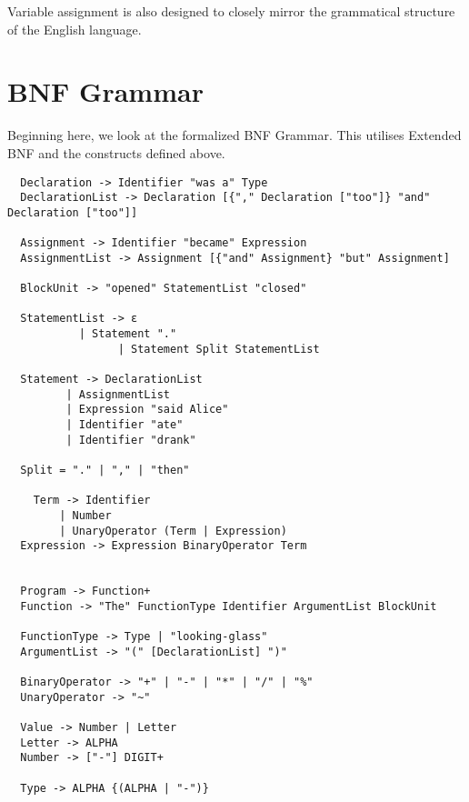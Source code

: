 \documentclass[a4wide, 11pt]{article}
\begin{document}
Variable assignment is also designed to closely mirror the grammatical structure of the English language.

\section{BNF Grammar} 

Beginning here, we look at the formalized BNF Grammar. This utilises Extended BNF and the constructs defined above.

\begin{verbatim}
  Declaration -> Identifier "was a" Type
  DeclarationList -> Declaration [{"," Declaration ["too"]} "and" Declaration ["too"]]

  Assignment -> Identifier "became" Expression
  AssignmentList -> Assignment [{"and" Assignment} "but" Assignment]

  BlockUnit -> "opened" StatementList "closed"

  StatementList -> ε
           | Statement "."
                 | Statement Split StatementList
                 
  Statement -> DeclarationList
         | AssignmentList
         | Expression "said Alice"
         | Identifier "ate"
         | Identifier "drank"

  Split = "." | "," | "then"
 
    Term -> Identifier
        | Number
        | UnaryOperator (Term | Expression)
  Expression -> Expression BinaryOperator Term


  Program -> Function+
  Function -> "The" FunctionType Identifier ArgumentList BlockUnit

  FunctionType -> Type | "looking-glass"
  ArgumentList -> "(" [DeclarationList] ")"

  BinaryOperator -> "+" | "-" | "*" | "/" | "%"
  UnaryOperator -> "~" 

  Value -> Number | Letter
  Letter -> ALPHA
  Number -> ["-"] DIGIT+
  
  Type -> ALPHA {(ALPHA | "-")}

\end{verbatim}




\end{document}
